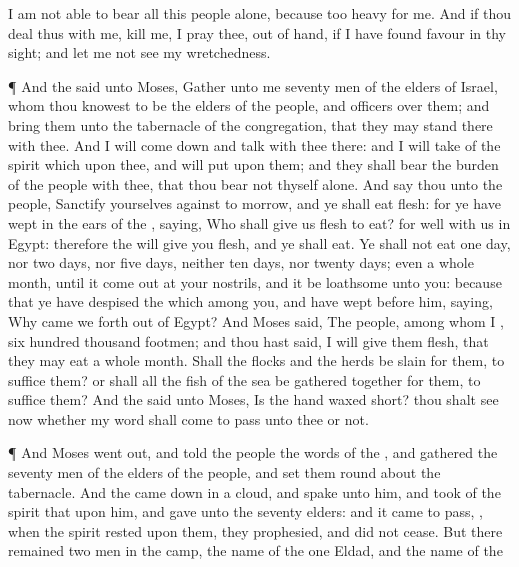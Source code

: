 {I am not
able to
bear all this
people
alone, because
{} too
heavy for me.
And if thou
deal thus with me,
kill me, I pray thee, out of
hand, if I have
found
favour in thy
sight; and let me not
see my
wretchedness.
\par }{\PP {}¶ And the
{}
said unto
Moses,
Gather unto me
seventy
men of the
elders of
Israel, whom thou
knowest to be the
elders of the
people, and
officers over them; and
bring them unto the
tabernacle of the
congregation, that they may
stand there with thee.
And I will come
down and
talk with thee there: and I will
take of the
spirit which
{} upon thee, and will
put
{} upon them; and they shall
bear the
burden of the
people with thee, that thou
bear
{} not thyself alone.
And
say thou unto the
people,
Sanctify yourselves against to
morrow, and ye shall
eat
flesh: for ye have
wept in the
ears of the
{},
saying, Who shall give us
flesh to
eat? for
{}
well with us in
Egypt: therefore the
{} will
give you
flesh, and ye shall
eat.
Ye shall not
eat
one
day, nor two
days, nor
five
days, neither
ten
days, nor
twenty
days;
 even a whole
month, until it come
out at your
nostrils, and it be
loathsome unto you:
because that ye have
despised the
{} which
{}
among you, and have
wept
before him,
saying, Why came we
forth out of
Egypt?
And
Moses
said, The
people,
among whom I
{},
{}
six
hundred
thousand
footmen; and thou hast
said, I will
give them
flesh, that they may
eat a
whole
month.
Shall the
flocks and the
herds be
slain for them, to
suffice them? or shall all the
fish of the
sea be gathered
together for them, to
suffice them?
And the
{}
said unto
Moses, Is the
{}
hand waxed
short? thou shalt
see now whether my
word shall come to
pass unto thee or not.
\par }{\PP {}¶ And
Moses went
out, and
told the
people the
words of the
{}, and
gathered the
seventy
men of the
elders of the
people, and
set them round
about the
tabernacle.
And the
{} came
down in a
cloud, and
spake unto him, and
took of the
spirit that
{} upon him, and
gave
{} unto the
seventy
elders: and it came to pass,
{}, when the
spirit
rested upon them, they
prophesied, and did not
cease.
But there
remained
two
{}
men in the
camp, the
name of the
one
{}
Eldad, and the
name of the
}

